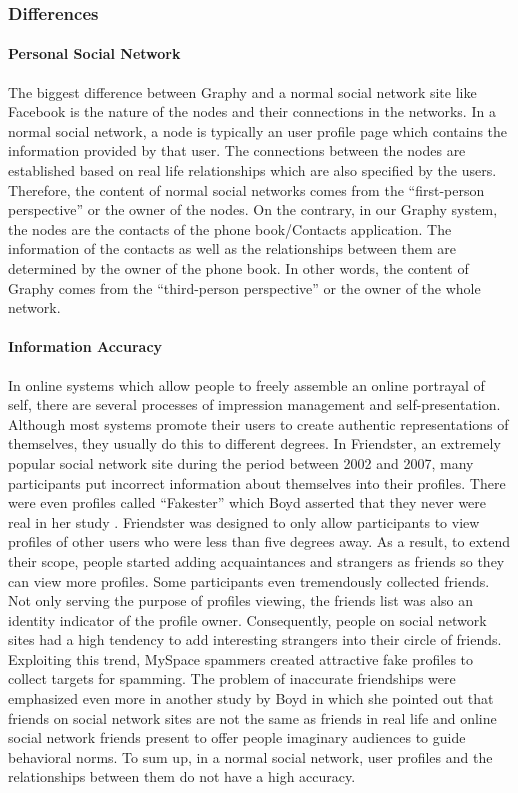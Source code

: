 \subsubsection{Differences}

\paragraph{Personal Social Network}
The biggest difference between Graphy and a normal social network site like Facebook is the nature of the nodes and their connections in the networks. In a normal social network, a node is typically an user profile page which contains the information provided by that user. The connections between the nodes are established based on real life relationships which are also specified by the users. Therefore, the content of normal social networks comes from the ``first-person perspective'' or the owner of the nodes. On the contrary, in our Graphy system, the nodes are the contacts of the phone book/Contacts application. The information of the contacts as well as the relationships between them are determined by the owner of the phone book. In other words, the content of Graphy comes from the ``third-person perspective'' or the owner of the whole network.

\paragraph{Information Accuracy}
In online systems which allow people to freely assemble an online portrayal of self, there are several processes of impression management and self-presentation. Although most systems promote their users to create authentic representations of themselves, they usually do this to different degrees. In Friendster, an extremely popular social network site during the period between 2002 and 2007, many participants put incorrect information about themselves into their profiles. There were even profiles called ``Fakester'' which Boyd asserted that they never were real in her study \cite{boyd2010social}. Friendster was designed to only allow participants to view profiles of other users who were less than five degrees away. As a result, to extend their scope, people started adding acquaintances and strangers as friends so they can view more profiles. Some participants even tremendously collected friends. Not only serving the purpose of profiles viewing, the friends list was also an identity indicator of the profile owner. Consequently, people on social network sites had a high tendency to add interesting strangers into their circle of friends. Exploiting this trend, MySpace spammers created attractive fake profiles to collect targets for spamming. The problem of inaccurate friendships were emphasized even more in another study by Boyd \cite{boyd2006friends} in which she pointed out that friends on social network sites are not the same as friends in real life and online social network friends present to offer people imaginary audiences to guide behavioral norms. To sum up, in a normal social network, user profiles and the relationships between them do not have a high accuracy.

